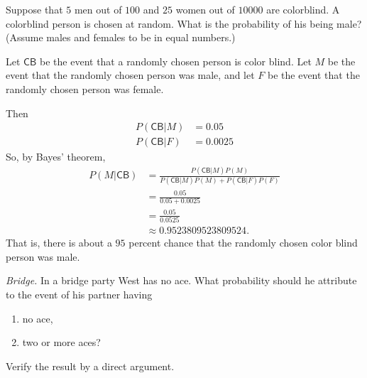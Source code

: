 \begin{problem}[Handout 4, \# 9]
  Suppose that \(5\) men out of \(100\) and \(25\) women out of
  \(\num{10000}\) are colorblind. A colorblind person is chosen at
  random. What is the probability of his being male? (Assume males and
  females to be in equal numbers.)
\end{problem}
\begin{solution}
  Let $\mathsf{\mathsf{CB}}$ be the event that a randomly chosen person is
  color blind. Let $M$ be the event that the randomly chosen person was
  male, and let $F$ be the event that the randomly chosen person was
  female.

  Then
  \begin{align*}
    P(\mathsf{CB}|M) &= 0.05 \\
    P(\mathsf{CB}|F) &= 0.0025
  \end{align*}
  So, by Bayes' theorem,
  \begin{align*}
    P(M|\mathsf{CB})
    &=\frac{P(\mathsf{CB}|M)P(M)}{P(\mathsf{CB}|M)P(M) + P(\mathsf{CB}|F)P(F)}\\
    &=\frac{0.05}{0.05+0.0025}\\
    &=\frac{0.05}{0.0525}\\
    &\approx\num{0.9523809523809524}.
  \end{align*}
  That is, there is about a \(95\) percent chance that the randomly chosen
  color blind person was male.
\end{solution}
\newpage

\begin{problem}[Handout 4, \# 10]
  \emph{Bridge.} In a bridge party West has no ace. What probability should
  he attribute to the event of his partner having
  \begin{enumerate}[label=(\alph*),noitemsep]
  \item no ace,
  \item two or more aces?
  \end{enumerate}
  Verify the result by a direct argument.
\end{problem}
\begin{solution}

\end{solution}
\newpage

